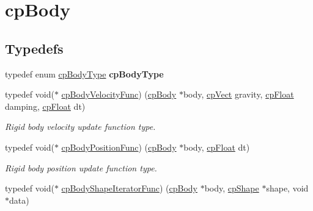 \hypertarget{group__cp_body}{}\section{cp\+Body}
\label{group__cp_body}
\subsection*{Typedefs}
\begin{DoxyCompactItemize}
\item 
\mbox{\label{group__cp_body_ga45565578b1dfe055f40930f24506807a}} 
typedef enum \mbox{\hyperlink{group__cp_body_ga3581b128fd3e2734952aeac8545fd5ca}{cp\+Body\+Type}} {\bfseries cp\+Body\+Type}
\item 
\mbox{\label{group__cp_body_gaa7a1f4706fb8e879c356ae99035ead71}} 
typedef void($\ast$ \mbox{\hyperlink{group__cp_body_gaa7a1f4706fb8e879c356ae99035ead71}{cp\+Body\+Velocity\+Func}}) (\mbox{\hyperlink{structcp_body}{cp\+Body}} $\ast$body, \mbox{\hyperlink{structcp_vect}{cp\+Vect}} gravity, \mbox{\hyperlink{group__basic_types_gac1ed65573e035bf892505768c852d8d3}{cp\+Float}} damping, \mbox{\hyperlink{group__basic_types_gac1ed65573e035bf892505768c852d8d3}{cp\+Float}} dt)
\begin{DoxyCompactList}\small\item\em Rigid body velocity update function type. \end{DoxyCompactList}\item 
\mbox{\label{group__cp_body_ga3386e3b0b4156289ab6099cc64c952e7}} 
typedef void($\ast$ \mbox{\hyperlink{group__cp_body_ga3386e3b0b4156289ab6099cc64c952e7}{cp\+Body\+Position\+Func}}) (\mbox{\hyperlink{structcp_body}{cp\+Body}} $\ast$body, \mbox{\hyperlink{group__basic_types_gac1ed65573e035bf892505768c852d8d3}{cp\+Float}} dt)
\begin{DoxyCompactList}\small\item\em Rigid body position update function type. \end{DoxyCompactList}\item 
\mbox{\label{group__cp_body_gacc4f466cbeaa87fc8b05c0357e1e316d}} 
typedef void($\ast$ \mbox{\hyperlink{group__cp_body_gacc4f466cbeaa87fc8b05c0357e1e316d}{cp\+Body\+Shape\+Iterator\+Func}}) (\mbox{\hyperlink{structcp_body}{cp\+Body}} $\ast$body, \mbox{\hyperlink{structcp_shape}{cp\+Shape}} $\ast$shape, void $\ast$data)

\end{DoxyCompactItemize}
